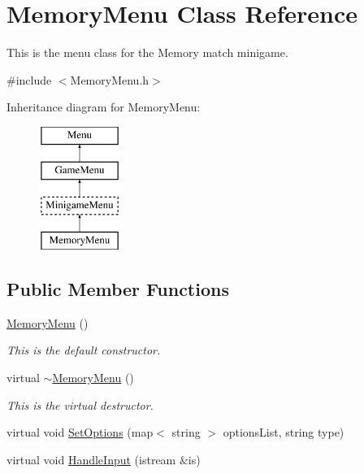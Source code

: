 \hypertarget{classMemoryMenu}{\section{Memory\-Menu Class Reference}
\label{classMemoryMenu}
}


This is the menu class for the Memory match minigame.  




{\ttfamily \#include $<$Memory\-Menu.\-h$>$}

Inheritance diagram for Memory\-Menu\-:\begin{figure}[H]
\begin{center}
\leavevmode
\includegraphics[height=4.000000cm]{classMemoryMenu}
\end{center}
\end{figure}
\subsection*{Public Member Functions}
\begin{DoxyCompactItemize}
\item 
\hyperlink{classMemoryMenu_ae86d93eea6621532fba704fed5c9ec33}{Memory\-Menu} ()
\begin{DoxyCompactList}\small\item\em This is the default constructor. \end{DoxyCompactList}\item 
virtual \hyperlink{classMemoryMenu_a5f18c54c803ba926fa18075e2ea2c0de}{$\sim$\-Memory\-Menu} ()
\begin{DoxyCompactList}\small\item\em This is the virtual destructor. \end{DoxyCompactList}\item 
virtual void \hyperlink{classMemoryMenu_a0fe0d5e2a88c6e633d6cd10651c132a4}{Set\-Options} (map$<$ string $>$ options\-List, string type)
\item 
virtual void \hyperlink{classMemoryMenu_ad507e3d6e2c10745cf4bcd3005e160b3}{Handle\-Input} (istream \&is)
\end{DoxyCompactItemize}
